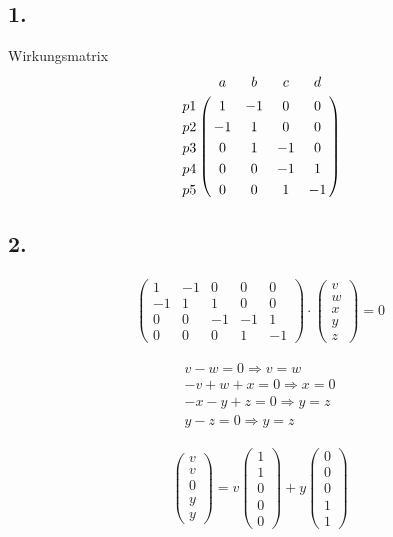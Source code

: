 \documentclass[a4paper,12pt]{scrartcl}
\begin{document}
\subsection{1.}
Wirkungsmatrix
\begin{align}
\bordermatrix{
   &  a	&  b &  c &  d \cr
p1 &  1 & -1 &  0 &  0 \cr
p2 & -1 &  1 &  0 &  0 \cr
p3 &  0 &  1 & -1 &  0 \cr
p4 &  0 &  0 & -1 &  1 \cr
p5 &  0 &  0 &  1 & -1 \cr}
\end{align}

\subsection{2.}
\begin{align}
\left(
   \begin{array}{ccccc}
     1 & -1 &  0 &  0 &  0 \\
    -1 &  1 &  1 &  0 &  0 \\
     0 &  0 & -1 & -1 &  1 \\
     0 &  0 &  0 &  1 & -1
   \end{array}
\right)
\cdot
\left(
   \begin{array}{c}
   v \\
   w \\
   x \\
   y \\
   z 
   \end{array}
\right)
= 0 
\end{align}

\begin{align}
v - w = 0 		\Rightarrow v = w \\
-v + w + x = 0 	\Rightarrow x = 0 \\
-x - y + z = 0 	\Rightarrow y = z \\
y - z = 0		\Rightarrow y = z
\end{align}

\begin{align}
\left(
   \begin{array}{c}
   v \\
   v \\
   0 \\
   y \\
   y 
   \end{array}
\right)
=
v
\left(
   \begin{array}{c}
   1 \\
   1 \\
   0 \\
   0 \\
   0 
   \end{array}
\right)
+
y
\left(
   \begin{array}{c}
   0 \\
   0 \\
   0 \\
   1 \\
   1 
   \end{array}
\right)
\end{align}
\end{document}
